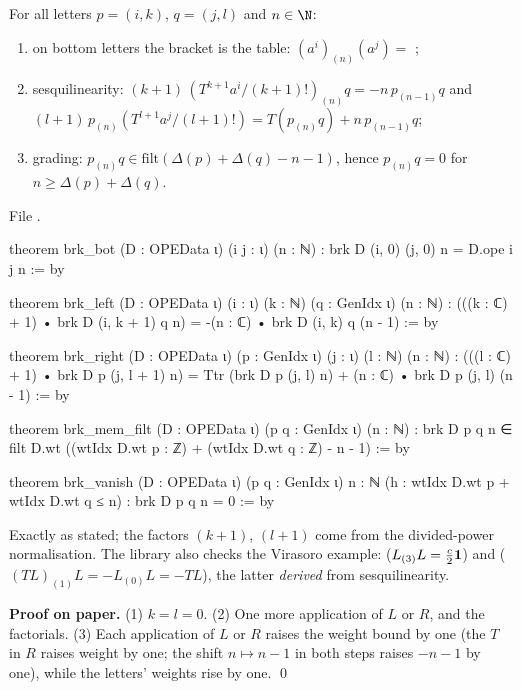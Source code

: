 \begin{theorem}\label{l11:thm:brk}
For all letters $p = (i,k)$, $q = (j,l)$ and $n\in\N$:
\begin{enumerate}
\item on bottom letters the bracket is the table: $(a^i)_{(n)}(a^j) = $ ;
\item sesquilinearity: $(k+1)\,(T^{k+1}a^i/(k+1)!)_{(n)}q = -n\,p_{(n-1)}q$ and
  $(l+1)\,p_{(n)}(T^{l+1}a^j/(l+1)!) = T(p_{(n)}q)+n\,p_{(n-1)}q$;
\item grading: $p_{(n)}q\in\mathrm{filt}(\Delta(p)+\Delta(q)-n-1)$, hence $p_{(n)}q = 0$ for $n\ge\Delta(p)+\Delta(q)$.
\end{enumerate}
\end{theorem}
\noindent File .
\begin{leancode}
theorem brk_bot (D : OPEData ι) (i j : ι) (n : ℕ) : brk D (i, 0) (j, 0) n = D.ope i j n := by

theorem brk_left (D : OPEData ι) (i : ι) (k : ℕ) (q : GenIdx ι) (n : ℕ) :
    (((k : ℂ) + 1) • brk D (i, k + 1) q n) = -(n : ℂ) • brk D (i, k) q (n - 1) := by

theorem brk_right (D : OPEData ι) (p : GenIdx ι) (j : ι) (l : ℕ) (n : ℕ) :
    (((l : ℂ) + 1) • brk D p (j, l + 1) n)
      = Ttr (brk D p (j, l) n) + (n : ℂ) • brk D p (j, l) (n - 1) := by

theorem brk_mem_filt (D : OPEData ι) (p q : GenIdx ι) (n : ℕ) :
    brk D p q n ∈ filt D.wt ((wtIdx D.wt p : ℤ) + (wtIdx D.wt q : ℤ) - n - 1) := by

theorem brk_vanish (D : OPEData ι) (p q : GenIdx ι) {n : ℕ}
    (h : wtIdx D.wt p + wtIdx D.wt q ≤ n) : brk D p q n = 0 := by
\end{leancode}

\begin{dictionary}
Exactly as stated; the factors $(k+1)$, $(l+1)$ come from the divided-power normalisation. The library also checks the
Virasoro example:  ($L_{(3)}L = \frac c2\mathbf{1}$) and 
($(TL)_{(1)}L = -L_{(0)}L = -TL$), the latter \emph{derived} from sesquilinearity.
\end{dictionary}

\textbf{Proof on paper.} (1) $k=l=0$. (2) One more application of $L$ or $R$, and the factorials. (3) Each application of $L$
or $R$ raises the weight bound by one (the $T$ in $R$ raises weight by one; the shift $n\mapsto n-1$ in both steps raises
$-n-1$ by one), while the letters' weights rise by one. \qed

